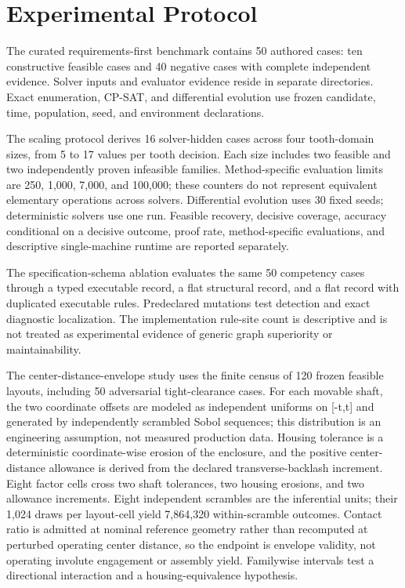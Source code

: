 \documentclass[preprint,12pt]{elsarticle}
\begin{document}
\section{Experimental Protocol}
The curated requirements-first benchmark contains 50 authored cases: ten constructive feasible cases and 40 negative cases with complete independent evidence. Solver inputs and evaluator evidence reside in separate directories. Exact enumeration, CP-SAT, and differential evolution use frozen candidate, time, population, seed, and environment declarations.

The scaling protocol derives 16 solver-hidden cases across four tooth-domain sizes, from 5 to 17 values per tooth decision. Each size includes two feasible and two independently proven infeasible families. Method-specific evaluation limits are 250, 1,000, 7,000, and 100,000; these counters do not represent equivalent elementary operations across solvers. Differential evolution uses 30 fixed seeds; deterministic solvers use one run. Feasible recovery, decisive coverage, accuracy conditional on a decisive outcome, proof rate, method-specific evaluations, and descriptive single-machine runtime are reported separately.

The specification-schema ablation evaluates the same 50 competency cases through a typed executable record, a flat structural record, and a flat record with duplicated executable rules. Predeclared mutations test detection and exact diagnostic localization. The implementation rule-site count is descriptive and is not treated as experimental evidence of generic graph superiority or maintainability.

The center-distance-envelope study uses the finite census of 120 frozen feasible layouts, including 50 adversarial tight-clearance cases. For each movable shaft, the two coordinate offsets are modeled as independent uniforms on [-t,t] and generated by independently scrambled Sobol sequences; this distribution is an engineering assumption, not measured production data. Housing tolerance is a deterministic coordinate-wise erosion of the enclosure, and the positive center-distance allowance is derived from the declared transverse-backlash increment. Eight factor cells cross two shaft tolerances, two housing erosions, and two allowance increments. Eight independent scrambles are the inferential units; their 1,024 draws per layout-cell yield 7,864,320 within-scramble outcomes. Contact ratio is admitted at nominal reference geometry rather than recomputed at perturbed operating center distance, so the endpoint is envelope validity, not operating involute engagement or assembly yield. Familywise intervals test a directional interaction and a housing-equivalence hypothesis.
\end{document}
